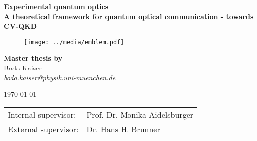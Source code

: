 \makeatletter
\begin{titlepage}
	\begin{center}
		\large
		    \textbf{\textsf{Experimental quantum optics}}\\
	    \vspace{0.8em}
		\huge
	    \textbf{\textsf{A theoretical framework for quantum optical communication - towards CV-QKD}}\\
		
		\vspace{1.2em}
		\begin{figure}[htb]
			\centering
			\texttt{[image: ../media/emblem.pdf]}
		\end{figure}
		
		\vspace{.6em}
	    \large
	    \textbf{Master thesis by}\\
		\vspace{.8em}
	    \large
		Bodo Kaiser\\
	    \vspace{.2em}
		\textit{bodo.kaiser@physik.uni-muenchen.de}

	    \large
	    \today

	    \vspace{1.9em}
		\normalsize
		\begin{tabular}{ll}
		Internal supervisor: & Prof. Dr. Monika Aidelsburger \\
		External supervisor: & Dr. Hans H. Brunner \\
		\end{tabular}
	\end{center}
\end{titlepage}
\makeatother
